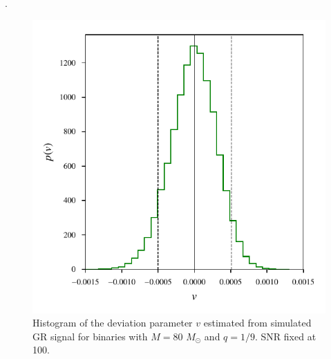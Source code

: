 \documentclass[prd,preprintnumbers,twocolumn,eqsecnum,floatfix,a4paper,nofootinbib,superscriptaddress]{revtex4}
\begin{document}
\newpage
.
\newpage

\begin{figure}[h!]
    \begin{center}
    \includegraphics[scale=0.7]{figs/v1_GR_hist_M_80_q_9_dL_250.pdf} 
    \end{center} 
    \caption{Histogram of the deviation parameter $v$ estimated from simulated GR signal for binaries with $M=80$ $M_{\odot}$ and $q=1/9$. SNR fixed at 100.}
    \label{fig:cs_hist}
\end{figure}
\end{document}
